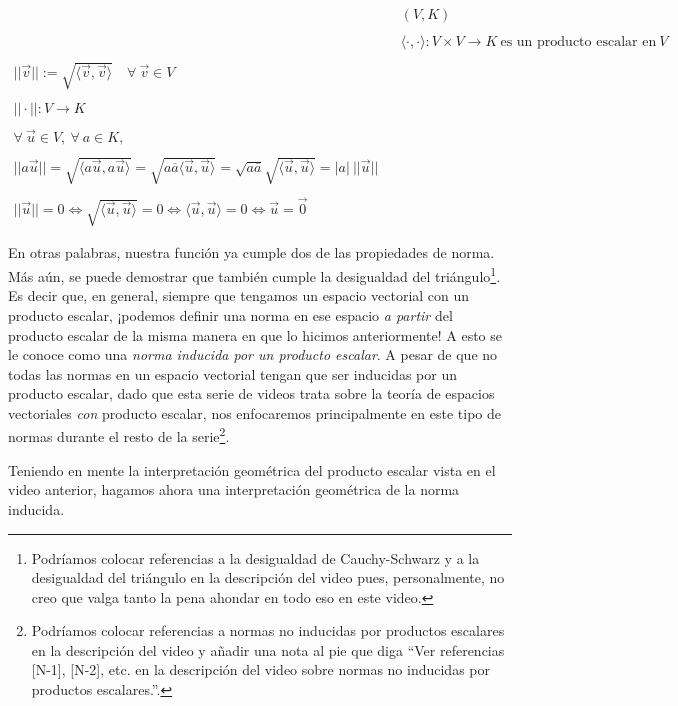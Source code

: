 \documentclass[12pt,dvipsnames]{article}
\numberwithin{equation}{section}
\begin{document}
\begin{align*}
    & &(V,K) \\
    \\
    & &\langle \cdot , \cdot \rangle : V\times V\to K \ \text{es un producto escalar en} \ V\\
    \\
    ||\vec{v}||:=\sqrt{\langle \vec{v} , \vec{v} \rangle} \quad \forall \ \vec{v}\in V\\
    \\
    ||\cdot||:V\to K\\
    \\
    \forall \ \vec{u}\in V, \ \forall \ a\in K,\\
    \\
    ||a\vec{u}|| = \sqrt{\langle a\vec{u} , a\vec{u} \rangle} = \sqrt{a\overline{a}\langle \vec{u} , \vec{u} \rangle} = \sqrt{a\overline{a}} \sqrt{\langle \vec{u} , \vec{u} \rangle} = |a| \ ||\vec{u}||\\
    \\
    ||\vec{u}|| = 0 \iff \sqrt{\langle \vec{u} , \vec{u} \rangle} = 0 \iff \langle \vec{u} , \vec{u} \rangle = 0 \iff \vec{u} = \vec{0}
\end{align*}

\noindent En otras palabras, nuestra función ya cumple dos de las propiedades de norma. Más aún, se puede demostrar que también cumple la desigualdad del triángulo\footnote{Podríamos colocar referencias a la desigualdad de Cauchy-Schwarz y a la desigualdad del triángulo en la descripción del video pues, personalmente, no creo que valga tanto la pena ahondar en todo eso en este video.}. Es decir que, en general, siempre que tengamos un espacio vectorial con un producto escalar, ¡podemos definir una norma en ese espacio \emph{a partir} del producto escalar de la misma manera en que lo hicimos anteriormente! A esto se le conoce como una \emph{norma inducida por un producto escalar}. A pesar de que no todas las normas en un espacio vectorial tengan que ser inducidas por un producto escalar, dado que esta serie de videos trata sobre la teoría de espacios vectoriales \emph{con} producto escalar, nos enfocaremos principalmente en este tipo de normas durante el resto de la serie\footnote{Podríamos colocar referencias a normas no inducidas por productos escalares en la descripción del video y añadir una nota al pie que diga ``Ver referencias [N-1], [N-2], etc. en la descripción del video sobre normas no inducidas por productos escalares.''.}.

Teniendo en mente la interpretación geométrica del producto escalar vista en el video anterior, hagamos ahora una interpretación geométrica de la norma inducida.
\end{document}
